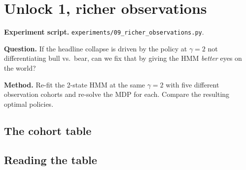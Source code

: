 \documentclass[11pt]{article}
\begin{document}
\section{Unlock 1, richer observations}

\textbf{Experiment script.} \texttt{experiments/09\_richer\_observations.py}.

\textbf{Question.} If the headline collapse is driven by the policy at $\gamma = 2$ not differentiating bull vs.\ bear, can we fix that by giving the HMM \emph{better} eyes on the world?

\textbf{Method.} Re-fit the 2-state HMM at the same $\gamma = 2$ with five different observation cohorts and re-solve the MDP for each. Compare the resulting optimal policies.

\subsection{The cohort table}

\begin{table}[H]\centering\small\setlength{\tabcolsep}{6pt}\renewcommand{\arraystretch}{1.1}
\caption{Observation-cohort study at $\gamma = 2$. ``Differs?'' is true iff the optimal action in the bull regime differs from the optimal action in the bear regime.}\label{tab:cohort}
\end{table}

\subsection{Reading the table}
\end{document}

